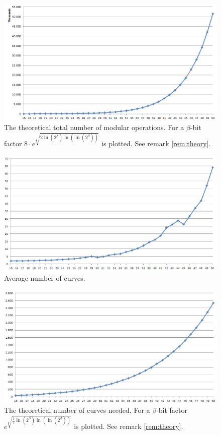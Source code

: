 \begin{figure}[htp]
\centering
\includegraphics[scale=0.6]{stat_TotalMult_theory.png}
\caption{The theoretical total number of modular operations. For a $\beta$-bit factor
$8\cdot e^{\sqrt{2\ln(2^\beta)\ln(\ln(2^\beta))}}$ is plotted. See remark \ref{rem:theory}.} 
\label{fig:dedicatedAddition}
\end{figure}
\begin{figure}[htp]
\centering
\includegraphics[scale=0.6]{stat_curves.png}
\caption{Average number of curves.}
\label{fig:dedicatedAddition}
\end{figure}
\begin{figure}[htp]
\centering
\includegraphics[scale=0.6]{stat_curves_theory.png}
\caption{The theoretical number of curves needed. For a $\beta$-bit factor
$e^{\sqrt{\frac{1}{2}\ln(2^\beta)\ln(\ln(2^\beta))}}$ is plotted. See remark \ref{rem:theory}.}
\label{fig:dedicatedAddition}
\end{figure}
